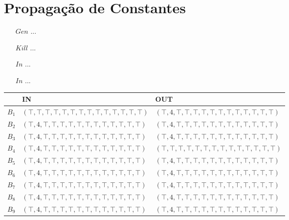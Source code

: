 \section{Propaga\c{c}\~ao de Constantes}

\begin{itemize}
  \item[$Gen$] ...
  \item[$Kill$] ...
  \item[$In$] ...
  \item[$In$] ...
\end{itemize}

\begin{table}[ht]
\centering
\begin{tabular}{l|l|l}
	& IN & OUT\\
\hline
$B_{1}$ &  $(\top,\top,\top,\top,\top,\top,\top,\top,\top,\top,\top,\top,\top,\top)$ & $(\top,4,\top,\top,\top,\top,\top,\top,\top,\top,\top,\top,\top,\top)$\\
$B_{2}$ &  $(\top,4,\top,\top,\top,\top,\top,\top,\top,\top,\top,\top,\top,\top)$ & $(\top,4,\top,\top,\top,\top,\top,\top,\top,\top,\top,\top,\top,\top)$\\
$B_{3}$ &  $(\top,4,\top,\top,\top,\top,\top,\top,\top,\top,\top,\top,\top,\top)$ & $(\top,4,\top,\top,\top,\top,\top,\top,\top,\top,\top,\top,\top,\top)$\\
$B_{4}$ &  $(\top,4,\top,\top,\top,\top,\top,\top,\top,\top,\top,\top,\top,\top)$ & $(\top,\top,\top,\top,\top,\top,\top,\top,\top,\top,\top,\top,\top,\top)$\\
$B_{5}$ &  $(\top,4,\top,\top,\top,\top,\top,\top,\top,\top,\top,\top,\top,\top)$ & $(\top,4,\top,\top,\top,\top,\top,\top,\top,\top,\top,\top,\top,\top)$\\
$B_{6}$ &  $(\top,4,\top,\top,\top,\top,\top,\top,\top,\top,\top,\top,\top,\top)$ & $(\top,4,\top,\top,\top,\top,\top,\top,\top,\top,\top,\top,\top,\top)$\\
$B_{7}$ &  $(\top,4,\top,\top,\top,\top,\top,\top,\top,\top,\top,\top,\top,\top)$ & $(\top,4,\top,\top,\top,\top,\top,\top,\top,\top,\top,\top,\top,\top)$\\
$B_{8}$ &  $(\top,4,\top,\top,\top,\top,\top,\top,\top,\top,\top,\top,\top,\top)$ & $(\top,4,\top,\top,\top,\top,\top,\top,\top,\top,\top,\top,\top,\top)$\\
$B_{9}$ &  $(\top,4,\top,\top,\top,\top,\top,\top,\top,\top,\top,\top,\top,\top)$ & $(\top,4,\top,\top,\top,\top,\top,\top,\top,\top,\top,\top,\top,\top)$\\

\end{tabular}
\end{table}
